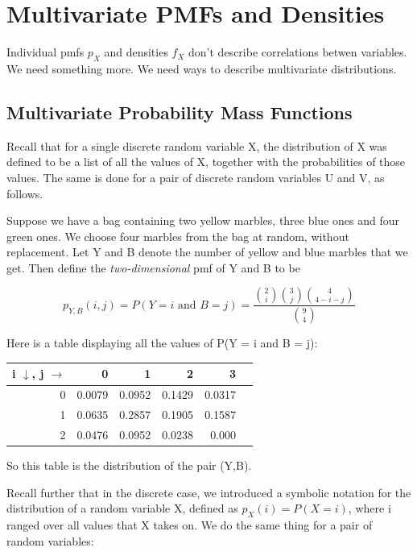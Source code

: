 \chapter{Multivariate PMFs and Densities}
\label{mul}

Individual pmfs $p_X$ and densities $f_X$ don't describe correlations
betwen variables.  We need something more.  We need ways to describe
multivariate distributions.

\section{Multivariate Probability Mass Functions} 
\label{marblepmf}

Recall that for a single discrete random variable X, the distribution of
X was defined to be a list of all the values of X, together with the
probabilities of those values.  The same is done for a pair of discrete
random variables U and V, as follows.

Suppose we have a bag containing two yellow marbles, three blue ones and
four green ones.  We choose four marbles from the bag at random,
without replacement.  Let Y and B denote the number of yellow and blue
marbles that we get.  Then define the {\it two-dimensional} pmf of Y and
B to be

\begin{equation}
p_{Y,B}(i,j) = P(Y = i \textrm{ and } B = j) = 
\frac
{
\binom{2}{i}
\binom{3}{j}
\binom{4}{4-i-j}
}
{\binom{9}{4}}
\end{equation}

Here is a table displaying all the values of P(Y = i and B = j):

\begin{tabular}{|r|r|r|r|r|r|}
\hline
i $\downarrow$, j $\rightarrow$ & 0 & 1 & 2 & 3 \\ \hline 
0 & 0.0079 & 0.0952 & 0.1429 & 0.0317 \\ \hline 
1 & 0.0635 & 0.2857 & 0.1905 & 0.1587 \\ \hline 
2 & 0.0476 & 0.0952 & 0.0238 & 0.000 \\ \hline 
\end{tabular}

So this table is the distribution of the pair (Y,B).

Recall further that in the discrete case, we introduced a symbolic
notation for the distribution of a random variable X, defined as
$p_X(i) = P(X = i)$, where i ranged over all values that X takes on.
We do the same thing for a pair of random variables:

